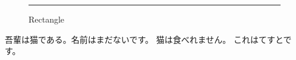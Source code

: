 \documentclass[uplatex,dvipdfmx]{jlreq}
\begin{document}
\lipsum[1-2]
  \begin{figure}[h]
    \centering
    \rule{8cm}{6cm}
    \caption{Rectangle}
  \end{figure}
吾輩は猫である。名前はまだないです。
猫は食べれません。
これはてすとです。
\end{document}

